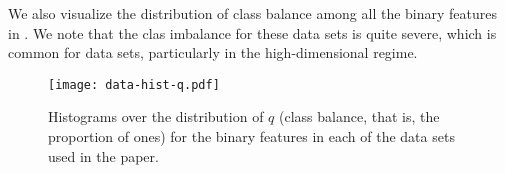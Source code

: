 We also visualize the distribution of class balance among all the binary features in
. We note that the clas imbalance for these data sets is quite
severe, which is common for data sets, particularly in the high-dimensional regime.

\begin{figure}[htpb]
  \centering
  \texttt{[image: data-hist-q.pdf]}
  \caption{%
    Histograms over the distribution of \(q\) (class balance, that is, the
    proportion of ones) for the binary features in each of the data sets
    used in the paper.
  }
  \label{fig:data-hist-q}
\end{figure}


